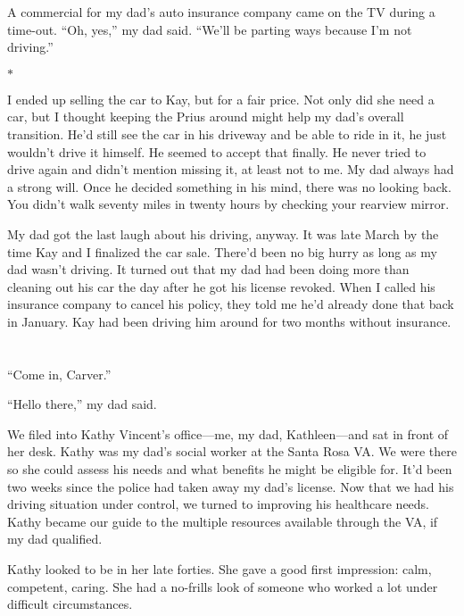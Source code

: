 \documentclass[12pt]{book}
\begin{document}
A commercial for my dad's auto insurance company came on the TV during a time-out. ``Oh, yes,'' my dad said. ``We'll be parting ways because I'm not driving.''

\begin{center}$*$\end{center}

I ended up selling the car to Kay, but for a fair price. Not only did she need a car, but I thought keeping the Prius around might help my dad's overall transition. He'd still see the car in his driveway and be able to ride in it, he just wouldn't drive it himself. He seemed to accept that finally. He never tried to drive again and didn't mention missing it, at least not to me. My dad always had a strong will. Once he decided something in his mind, there was no looking back. You didn't walk seventy miles in twenty hours by checking your rearview mirror.

My dad got the last laugh about his driving, anyway. It was late March by the time Kay and I finalized the car sale. There'd been no big hurry as long as my dad wasn't driving. It turned out that my dad had been doing more than cleaning out his car the day after he got his license revoked. When I called his insurance company to cancel his policy, they told me he'd already done that back in January. Kay had been driving him around for two months without insurance.




\chapter{}

``Come in, Carver.''

``Hello there,'' my dad said.

We filed into Kathy Vincent's office---me, my dad, Kathleen---and sat in front of her desk. Kathy was my dad's social worker at the Santa Rosa VA. We were there so she could assess his needs and what benefits he might be eligible for. It'd been two weeks since the police had taken away my dad's license. Now that we had his driving situation under control, we turned to improving his healthcare needs. Kathy became our guide to the multiple resources available through the VA, if my dad qualified.

Kathy looked to be in her late forties. She gave a good first impression: calm, competent, caring. She had a no-frills look of someone who worked a lot under difficult circumstances.
\end{document}
